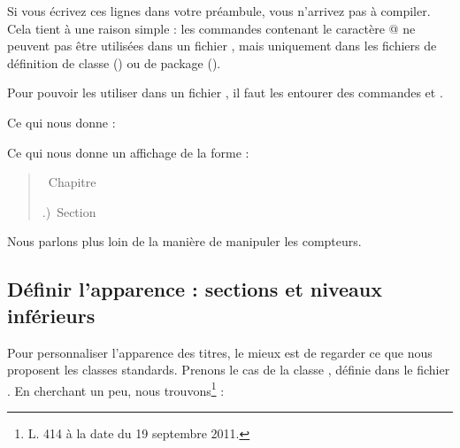 \label{makeatletter}Si vous écrivez ces lignes dans votre préambule, vous n'arrivez pas à compiler. Cela tient à une raison simple : les commandes contenant le caractère @ ne peuvent pas être  utilisées dans un fichier , mais uniquement dans les fichiers de définition de classe () ou de package ().

Pour pouvoir les utiliser dans un fichier , il faut les entourer des commandes  et .

Ce qui nous donne : 

\begin{latexcode}
\makeatletter
\renewcommand \thechapter {\@Roman\c@chapter}
\renewcommand \thesection {\thechapter.\@arabic\c@section)}
\makeatother
\end{latexcode}


\makeatletter
\let\oldthechapter\thechapter
\let\oldthesection\thesection
\renewcommand \thechapter {\@Roman\c@chapter}
\renewcommand \thesection {\thechapter.\@arabic\c@section)}
\makeatother

Ce qui nous donne un affichage de la forme :


\begin{quotation}
\thechapter~Chapitre 

\thesection~Section
\end{quotation}

\renewcommand{\thechapter}{\oldthechapter}
\renewcommand{\thesection}{\oldthesection}


\begin{plusloins}
Nous parlons plus loin de la manière de manipuler les compteurs.
\end{plusloins}

\subsection{Définir l'apparence : sections et niveaux inférieurs}\label{apparencetitre}

Pour personnaliser l'apparence des titres, le mieux est de regarder ce que nous proposent les classes standards. Prenons le cas de la classe , définie dans le fichier . En cherchant un peu, nous trouvons\footnote{L. 414 à la date du 19 septembre 2011.} :

\begin{latexcode}
\newcommand\section{\@startsection {section}{1}{\z@}%
                             {-3.5ex \@plus -1ex \@minus -.2ex}%
                             {2.3ex \@plus.2ex}%
                             {\normalfont\Large\bfseries}}
\end{latexcode}

